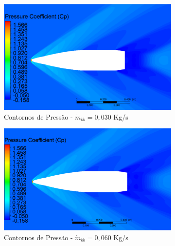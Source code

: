 \begin{figure}[!ht]
	\centering
	\begin{subfigure}[b]{0.47\textwidth}
        \centering
        \includegraphics[width=\textwidth]{contorno-pressao-2306K-vazao-0030-2pol.png}
        \caption{Contornos de Pressão - $\Dot{m}_{bb} = 0,030$ Kg/s}
        \label{fig:contorno-pressao-bb-2pol-vazao-0030}
    \end{subfigure}
    \hfill
    \begin{subfigure}[b]{0.47\textwidth}
        \centering
        \includegraphics[width=\textwidth]{contorno-pressao-2306K-vazao-0060-2pol.png}
        \caption{Contornos de Pressão - $\Dot{m}_{bb} = 0,060$ Kg/s}
        \label{fig:contorno-pressao-bb-2pol-vazao-0060}
    \end{subfigure}
    \hfill
    \begin{subfigure}[b]{0.47\textwidth}
        \centering

\end{subfigure}
\end{figure}
